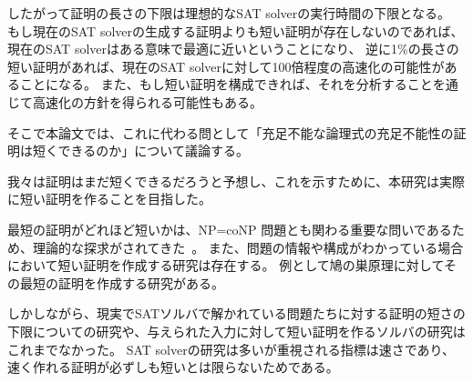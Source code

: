 \begin{comment}
さらに、短い証明を作ることは、ソルバの性能の限界に関する間接的な答えを与えることができる。
SAT solverは充足不能な命題に対して充足不能性の証明を与えるため、
\end{comment}
したがって証明の長さの下限は理想的なSAT solverの実行時間の下限となる。 
もし現在のSAT solverの生成する証明よりも短い証明が存在しないのであれば、
現在のSAT solverはある意味で最適に近いということになり、
逆に1\%の長さの短い証明があれば、現在のSAT solverに対して100倍程度の高速化の可能性があることになる。
また、もし短い証明を構成できれば、それを分析することを通じて高速化の方針を得られる可能性もある。

%
%

そこで本論文では、これに代わる問として「充足不能な論理式の充足不能性の証明は短くできるのか」について議論する。

我々は証明はまだ短くできるだろうと予想し、これを示すために、本研究は実際に短い証明を作ることを目指した。

最短の証明がどれほど短いかは、NP=coNP 問題とも関わる重要な問いであるため、理論的な探求がされてきた~\cite{}。
また、問題の情報や構成がわかっている場合において短い証明を作成する研究は存在する。
例として鳩の巣原理に対してその最短の証明を作成する研究がある。

しかしながら、現実でSATソルバで解かれている問題たちに対する証明の短さの下限についての研究や、与えられた入力に対して短い証明を作るソルバの研究はこれまでなかった。
SAT solverの研究は多いが重視される指標は速さであり、速く作れる証明が必ずしも短いとは限らないためである。

